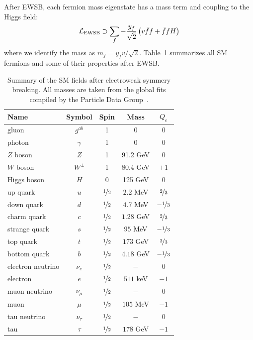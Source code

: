 After EWSB, each fermion mass eigenstate has a mass term and coupling to the Higgs field:
\begin{equation}
    \mathcal{L}_\mathrm{EWSB} \supset \sum_f -\frac{y_f }{\sqrt{2}} \left( v\bar ff + \bar f f H\right)
\end{equation}
where we identify the mass as ${m_f = y_f v/\sqrt{2}}$. 
Table~\ref{tab:theory:ewsb} summarizes all SM fermions and some of their properties after EWSB.

\begin{table}[]
\begin{center}
    \caption{Summary of the SM fields after electroweak symmery breaking.
             All masses are taken from the global fits compiled by the Particle Data Group~\cite{pdg}.}
    \label{tab:theory:ewsb}
    \begin{tabular}{l|c|c|c|c}
        Name & Symbol & Spin & Mass & ${Q_e}$  \\  \hline \hline
        gluon & ${g^{ab}}$ & 1 & 0 & 0 \\   
        photon & ${\gamma }$ & 1 & 0 & 0 \\   
        ${Z}$ boson & ${Z}$ & 1 & 91.2 GeV & 0 \\   
        ${W}$ boson & ${W^{\pm}}$ & 1 & 80.4 GeV & ${\pm 1}$ \\   \hline 
        Higgs boson & ${H}$ & 0 & 125 GeV & ${0}$ \\   \hline 
        up quark & ${u}$ & ${\nicefrac{1}{2}}$ & ${2.2}$ MeV & ${\nicefrac{2}{3}}$    \\   
        down quark & ${d}$  & ${\nicefrac{1}{2}}$ & ${4.7}$ MeV  & ${-\nicefrac{1}{3}}$  \\   
        charm quark & ${c}$  & ${\nicefrac{1}{2}}$ & ${1.28}$ GeV  & ${\nicefrac{2}{3}}$  \\   
        strange quark & ${s}$  & ${\nicefrac{1}{2}}$ & ${95}$ MeV  & ${-\nicefrac{1}{3}}$  \\   
        top quark & ${t}$  & ${\nicefrac{1}{2}}$ & ${173}$ GeV  & ${\nicefrac{2}{3}}$  \\  
        bottom quark & ${b}$  & ${\nicefrac{1}{2}}$ & ${4.18}$ GeV  & ${-\nicefrac{1}{3}}$  \\   \hline
        electron neutrino  & ${\nu_e}$  & ${\nicefrac{1}{2}}$ & ${-}$  & ${0}$  \\   
        electron  & ${e}$  & ${\nicefrac{1}{2}}$ & ${511}$ keV  & ${-1}$  \\   
        muon neutrino  & ${\nu_\mu}$  & ${\nicefrac{1}{2}}$ & ${-}$  & ${0}$  \\   
        muon  & ${\mu}$  & ${\nicefrac{1}{2}}$ & ${105}$ MeV  & ${-1}$  \\   
        tau neutrino  & ${\nu_\tau}$  & ${\nicefrac{1}{2}}$ & ${-}$  & ${0}$  \\ 
        tau  & ${\tau}$  & ${\nicefrac{1}{2}}$ & ${178}$ GeV  & ${-1}$  \\   
    \end{tabular}
\end{center}
\end{table}

